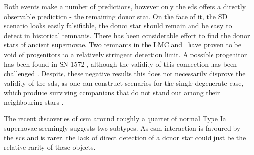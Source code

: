 \documentclass[preprint2]{aastex}
\begin{document}
Both events make a number of predictions, however only the \gls{sds} offers a directly observable prediction - the remaining donor star. On the face of it, the SD scenario looks easily falsifiable, the donor star should remain \citep[e.g.][]{2000ApJS..128..615M} and be easy to detect in historical remnants. There has been considerable effort \citep{2004Natur.431.1069R, 2009ApJ...691....1G,2009ApJ...701.1665K,2012Natur.481..164S,2012Natur.489..533G,2012arXiv1210.2713K,2012ApJ...759....7K, 2012ApJ...747L..19E} to find the donor stars of ancient supernovae. Two remnants in the LMC and \ have proven to be void of progenitors to a relatively stringent detection limit. A possible progenitor has been found in SN 1572 \citep{2004Natur.431.1069R}, although the validity of this connection has been challenged \citep{2012arXiv1210.2713K}. Despite, these negative results this does not necessarily disprove the validity of the \gls{sds}, as one can construct scenarios for the single-degenerate case, which produce surviving companions that do not stand out among their neighbouring stars \citep[e.g.][]{2012ApJ...760...21P, 2013arXiv1303.2691L, 2003astro.ph..3660P}. 

The recent discoveries of \gls{csm} around roughly a quarter of normal Type Ia supernovae \citep{2007Sci...317..924P, 2009ApJ...702.1157S, 2011Sci...333..856S, 2012ApJ...752..101F} seemingly suggests two subtypes. As \gls{csm} interaction is favoured by the \gls{sds} and is rarer, the lack of direct detection of a donor star could just be the relative rarity of these objects.
\end{document}
